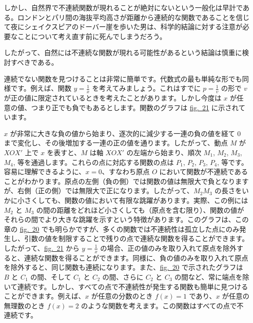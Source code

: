 \documentclass[a4paper,11pt,openany]{ltjsbook}
\providecommand{\Fig}[2][Fig.]{\hyperref[fig:#2]{#1~#2}}
\begin{document}
しかし、自然界で不連続関数が現れることが絶対にないという一般化は早計である。ロンドンとパリ間の海抜平均高さが距離から連続的な関数であることを信じて夜にシェイクスピアのドーバー崖を歩いた男は、科学的結論に対する注意が必要なことについて考え直す前に死んでしまうだろう。

したがって、自然には不連続な関数が現れる可能性があるという結論は慎重に検討すべきである。

連続でない関数を見つけることは非常に簡単です。代数式の最も単純な形でも同様です。例えば、関数 $y = \frac{1}{x}$ を考えてみましょう。これはすでに $p = \frac{1}{v}$ の形で $v$ が正の値に限定されているときを考えたことがあります。しかし今度は $x$ が任意の値、つまり正でも負でもあるとします。関数のグラフは \Fig[fig.]{21} に示されています。

$x$ が非常に大きな負の値から始まり、逐次的に減少する一連の負の値を経て $0$ まで変化し、その後増加する一連の正の値を通ります。したがって、動点 $M$ が $XOX'$ 上で $x$ を表すと、$M$ は軸 $XOX'$ の左端から始まり、順次 $M_{1}$, $M_{2}$, $M_{3}$, $M_{4}$, 等を通過します。これらの点に対応する関数の点は $P_{1}$, $P_{2}$, $P_{3}$, $P_{4}$, 等です。容易に理解できるように、$x = 0$、すなわち原点 $O$ において関数が不連続であることがわかります。原点の左側（負の側）では関数の値は無限大で負となりますが、右側（正の側）では無限大で正になります。したがって、$M_{2} M_{3}$ の長さをいかに小さくしても、関数の値において有限な跳躍があります。実際、この例には $M_{2}$ と $M_{3}$ の間の距離をどれほど小さくしても（原点を含む限り）、関数の値がそれらの間でより大きな跳躍を示すという特徴があります。このグラフは、この章の \Fig[fig.]{20} でも明らかですが、多くの関数では不連続性は孤立した点にのみ発生し、引数の値を制限することで残りの点で連続な関数を得ることができます。したがって、\Fig[fig.]{21} から $y = \frac{1}{x}$ の場合、正の値のみを取り入れて原点を除外すると、連続な関数を得ることができます。同様に、負の値のみを取り入れて原点を除外すると、同じ関数も連続になります。また、\Fig[fig.]{20} で示されたグラフは $B$ と $C_{1}$ の間、そして $C_{1}$ と $C_{2}$ の間、さらに $C_{2}$ と $C_{3}$ の間など、常に端点を除いて連続です。しかし、すべての点で不連続性が発生する関数も簡単に見つけることができます。例えば、$x$ が任意の分数のとき $f(x) = 1$ であり、$x$ が任意の無理数のとき $f(x) = 2$ のような関数を考えます。この関数はすべての点で不連続です。
\end{document}
